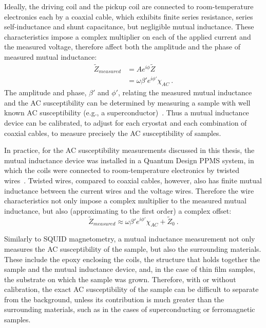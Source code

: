 Ideally, the driving coil and the pickup coil are connected to room-temperature electronics each by a coaxial cable, which exhibits finite series resistance, series self-inductance and shunt capacitance, but negligible mutual inductance. These characteristics impose a complex multiplier on each of the applied current and the measured voltage, therefore affect both the amplitude and the phase of measured mutual inductance:%
\begin{align}%
    \widetilde{Z}_{measured} &= Ae^{i\phi}\widetilde{Z}\nonumber\\
        &= \omega\beta'e^{i\phi'}\chi_{AC}~.\label{eq:mi_coax}
\end{align}%
The amplitude and phase, $\beta'$ and $\phi'$, relating the measured mutual inductance and the AC susceptibility can be determined by measuring a sample with well known AC susceptibility (e.g., a superconductor)~\cite{Jeanneret1989, HahnThesis}. Thus a mutual inductance device can be calibrated, to adjust for each cryostat and each combination of coaxial cables, to measure precisely the AC susceptibility of samples.

In practice, for the AC susceptibility measurements discussed in this thesis, the mutual inductance device was installed in a Quantum Design PPMS system, in which the coils were connected to room-temperature electronics by twisted wires~\cite{ppms_ac}. Twisted wires, compared to coaxial cables, however, also has finite mutual inductance between the current wires and the voltage wires. Therefore the wire characteristics not only impose a complex multiplier to the measured mutual inductance, but also (approximating to the first order) a complex offset:%
\begin{equation}%
    \widetilde{Z}_{measured} \approx \omega\beta'e^{i\phi'}\chi_{AC} + \widetilde{Z}_0~.\label{eq:mi_twisted}
\end{equation}%

Similarly to SQUID magnetometry, a mutual inductance measurement not only measures the AC susceptibility of the sample, but also the surrounding materials. These include the epoxy enclosing the coils, the structure that holds together the sample and the mutual inductance device, and, in the case of thin film samples, the substrate on which the sample was grown. Therefore, with or without calibration, the exact AC susceptibility of the sample can be difficult to separate from the background, unless its contribution is much greater than the surrounding materials, such as in the cases of superconducting or ferromagnetic samples.

